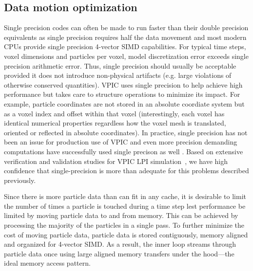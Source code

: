 \documentclass[10pt]{article}
\begin{document}
\subsection{Data motion optimization}

Single precision codes can often be made to run faster than their
double precision equivalents as single precision requires half the
data movement and most modern CPUs provide single precision 4-vector
SIMD capabilities.  For typical time steps, voxel dimensions and
particles per voxel, model discretization error exceeds single
precision arithmetic error.  Thus, single precision should usually be
acceptable provided it does not introduce non-physical artifacts
(e.g. large violations of otherwise conserved quantities).  VPIC uses
single precision to help achieve high performance but takes care to
structure operations to minimize its impact.  For example, particle
coordinates are not stored in an absolute coordiate system but as a
voxel index and offset within that voxel (interestingly, each voxel
has identical numerical properties regardless how the voxel mesh is
translated, oriented or reflected in absolute coordinates).  In
practice, single precision has not been an issue for production use of
VPIC and even more precision demanding computations have successfully
used single precison as well
\cite{Bowers_et_al_2006,Langou_et_al_2006,Lippert_et_al_2007}.
Based on extensive verification and validation studies for VPIC LPI
simulation~\cite{Yin_et_al_Phys_Plasmas_2006}, we have high confidence
that single-precision is more than adequate for this problems
described previously.

Since there is more particle data than can fit in any cache, it is
desirable to limit the number of times a particle is touched during a
time step lest performance be limited by moving particle data to and
from memory.  This can be achieved by processing the majority of the
particles in a single pass.  To further minimize the cost of moving
particle data, particle data is stored contiguously, memory aligned
and organized for 4-vector SIMD.  As a result, the inner loop streams
through particle data once using large aligned memory transfers under
the hood---the ideal memory access pattern.
\end{document}
